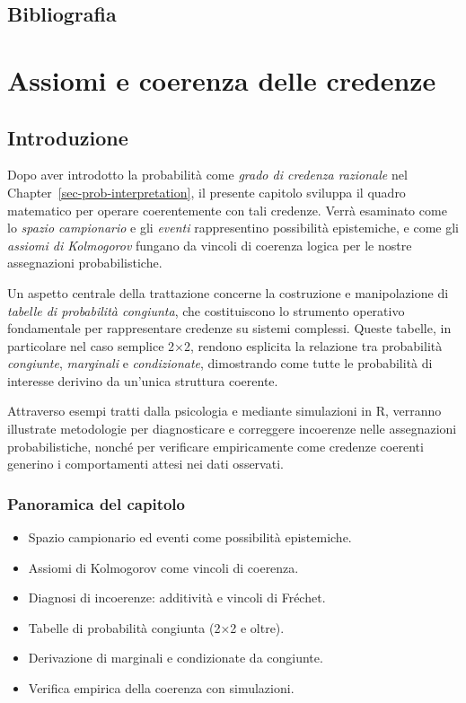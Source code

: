 \documentclass[
  letterpaper,
  DIV=11,
  numbers=noendperiod,
  oneside]{scrreprt}
\providecommand{\tightlist}{%
  \setlength{\itemsep}{0pt}\setlength{\parskip}{0pt}}
\theoremstyle{definition}
\theoremstyle{plain}
\theoremstyle{definition}
\theoremstyle{remark}
\begin{document}
\section*{Bibliografia}\label{bibliografia}


\chapter{Assiomi e coerenza delle
credenze}\label{sec-prob-axioms-coherence}

\section*{Introduzione}\label{introduzione-2}


Dopo aver introdotto la probabilità come \emph{grado di credenza
razionale} nel Chapter~\ref{sec-prob-interpretation}, il presente
capitolo sviluppa il quadro matematico per operare coerentemente con
tali credenze. Verrà esaminato come lo \emph{spazio campionario} e gli
\emph{eventi} rappresentino possibilità epistemiche, e come gli
\emph{assiomi di Kolmogorov} fungano da vincoli di coerenza logica per
le nostre assegnazioni probabilistiche.

Un aspetto centrale della trattazione concerne la costruzione e
manipolazione di \emph{tabelle di probabilità congiunta}, che
costituiscono lo strumento operativo fondamentale per rappresentare
credenze su sistemi complessi. Queste tabelle, in particolare nel caso
semplice 2×2, rendono esplicita la relazione tra probabilità
\emph{congiunte}, \emph{marginali} e \emph{condizionate}, dimostrando
come tutte le probabilità di interesse derivino da un'unica struttura
coerente.

Attraverso esempi tratti dalla psicologia e mediante simulazioni in R,
verranno illustrate metodologie per diagnosticare e correggere
incoerenze nelle assegnazioni probabilistiche, nonché per verificare
empiricamente come credenze coerenti generino i comportamenti attesi nei
dati osservati.

\subsection*{Panoramica del capitolo}\label{panoramica-del-capitolo-1}

\begin{itemize}
\tightlist
\item
  Spazio campionario ed eventi come possibilità epistemiche.
\item
  Assiomi di Kolmogorov come vincoli di coerenza.
\item
  Diagnosi di incoerenze: additività e vincoli di Fréchet.
\item
  Tabelle di probabilità congiunta (2×2 e oltre).
\item
  Derivazione di marginali e condizionate da congiunte.
\item
  Verifica empirica della coerenza con simulazioni.
\end{itemize}
\end{document}
